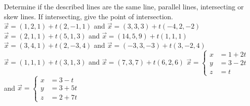 

\begin{Exercise}[
name={},
title={}, 
difficulty=0,
origin={\cite{GHC}}]
Determine if the described lines are the same line, parallel lines, intersecting or skew lines. If intersecting, give the point of intersection.
\Question $\vec x = (1,2,1) + t(2,-1,1)$ and $\vec x = (3,3,3) + t(-4,2,-2)$
\Question $\vec x = (2,1,1) + t(5,1,3)$ and $\vec x = (14,5,9) + t(1,1,1)$
\Question $\vec x = (3,4,1) + t(2,-3,4)$ and $\vec x = (-3,3,-3) + t(3,-2,4)$
\Question $\vec x = (1,1,1) + t(3,1,3)$ and $\vec x = (7,3,7) + t(6,2,6)$
\Question $\vec x = \left\{\begin{aligned} x&= 1+2t\\ y&= 3-2t\\ z&= t\end{aligned}\right.$ \quad and \quad
$\vec x = \left\{\begin{aligned} x&= 3-t\\ y&= 3+5t\\ z&= 2+7t\end{aligned}\right.$


\end{Exercise}

